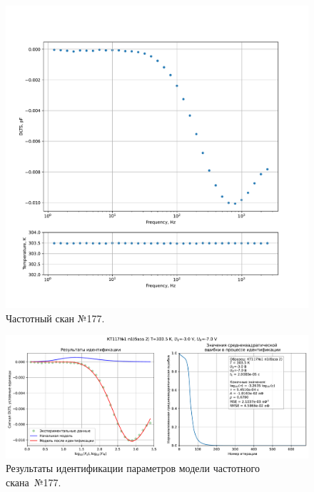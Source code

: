 \begin{figure}[!ht]
    \centering
    \includegraphics[width=1\textwidth]{../plots/КТ117№1_п1(база 2)_2500Гц-1Гц_1пФ_+30С_-3В-7В_200мВ_20мкс_шаг_0,1.pdf}
    \caption{Частотный скан №177.}
    \label{pic:frequency_scan_177}
\end{figure}

\begin{figure}[!ht]
    \centering
    \includegraphics[width=1\textwidth]{../plots/КТ117№1_п1(база 2)_2500Гц-1Гц_1пФ_+30С_-3В-7В_200мВ_20мкс_шаг_0,1_model.pdf}
    \caption{Результаты идентификации параметров модели частотного скана~№177.}
    \label{pic:frequency_scan_model177}
\end{figure}

\pagebreak


